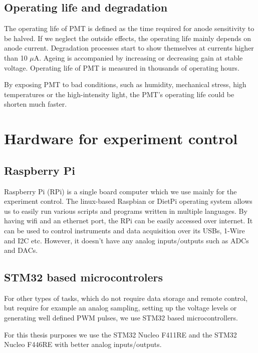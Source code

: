 \subsection{Operating life and degradation}
The operating life of PMT is defined as the time required for anode sensitivity to be halved. If we neglect the outside effects, the operating life mainly depends on anode current. 
Degradation processes start to show themselves at currents higher than 10 $\mu$A. Ageing is accompanied by increasing or decreasing gain at stable voltage. Operating life of PMT is measured in thousands of operating hours.
\par
By exposing PMT to bad conditions, such as humidity, mechanical stress, high temperatures or the high-intensity light, the PMT's operating life could be shorten much faster.

\section{Hardware for experiment control}

\subsection{Raspberry Pi}
Raspberry Pi (RPi) is a single board computer which we use mainly for the experiment control. The linux-based Raspbian or DietPi operating system allows us to easily run various scripts and programs written in multiple languages. By having wifi and an ethernet port, the RPi can be easily accessed over internet. It can be used to control instruments and data acquisition over its USBs, 1-Wire and I2C etc. However, it doesn't have any analog inputs/outputs such as ADCs and DACs.
\subsection{STM32 based microcontrolers}
For other types of tasks, which do not require data storage and remote control, but require for example an analog sampling, setting up the voltage levels or generating well defined PWM pulses, we use STM32 based microcontrollers. 
\par
For this thesis purposes we use the STM32 Nucleo F411RE and the STM32 Nucleo F446RE with better analog inputs/outputs.

